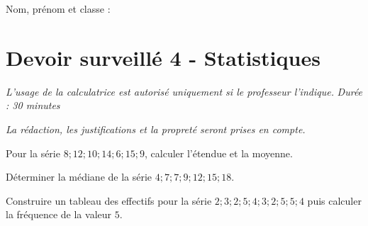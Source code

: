 \documentclass[a4paper,10pt]{report}
\begin{document}
\pagestyle{empty}
\noindent Nom, prénom et classe : \dotfill

\section*{Devoir surveillé 4 - Statistiques}

\noindent \textit{L'usage de la calculatrice est autorisé uniquement si le professeur l'indique.} \hfill \textit{Durée : 30 minutes}

\medskip
\noindent \textit{La rédaction, les justifications et la propreté seront prises en compte.}


\begin{ex}[Indicateurs]
Pour la série $8; 12; 10; 14; 6; 15; 9$, calculer l'étendue et la moyenne.
\medskip\noindent\grandscarreaux{\linewidth}{4cm}
\end{ex}
\begin{ex}[Médiane]
Déterminer la médiane de la série $4; 7; 7; 9; 12; 15; 18$.
\medskip\noindent\grandscarreaux{\linewidth}{3cm}
\end{ex}
\begin{ex}[Tableau]
Construire un tableau des effectifs pour la série $2;3;2;5;4;3;2;5;5;4$ puis calculer la fréquence de la valeur $5$.
\medskip\noindent\grandscarreaux{\linewidth}{5cm}
\end{ex}
\end{document}
